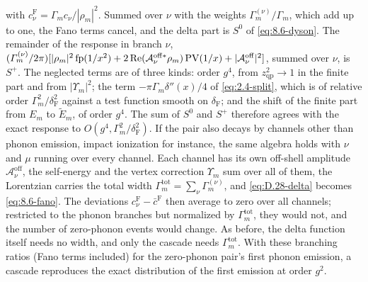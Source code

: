with $c^{\mathrm{F}}_\nu = \varGamma_mc_\nu/|\rho_m|^2$. Summed over $\nu$ with the weights $\varGamma^{(\nu)}_m/\varGamma_m$, which add up to one, the Fano terms cancel, and the delta part is $S^0$ of \cref{eq:8.6-dyson}. The remainder of the response in branch $\nu$, $(\varGamma^{(\nu)}_m/2\pi)[|\rho_m|^2\operatorname{fp}(1/x^2) + 2\operatorname{Re}(\mathcal{A}^{\mathrm{off}*}_\nu\rho_m)\operatorname{PV}(1/x) + |\mathcal{A}^{\mathrm{off}}_\nu|^2]$, summed over $\nu$, is $S^+$. The neglected terms are of three kinds: order $g^4$, from $z_{\mathrm{qp}}^2 \to 1$ in the finite part and from $|\Upsilon_m|^2$; the term $-\pi\varGamma_m\delta''(x)/4$ of \cref{eq:2.4-split}, which is of relative order $\varGamma_m^2/\delta_{\mathrm{F}}^2$ against a test function smooth on $\delta_{\mathrm{F}}$; and the shift of the finite part from $E_m$ to $\tilde E_m$, of order $g^4$. The sum of $S^0$ and $S^+$ therefore agrees with the exact response to $O(g^4, \varGamma_m^2/\delta_{\mathrm{F}}^2)$. If the pair also decays by channels other than phonon emission, impact ionization for instance, the same algebra holds with $\nu$ and $\mu$ running over every channel. Each channel has its own off-shell amplitude $\mathcal{A}^{\mathrm{off}}_\nu$, the self-energy and the vertex correction $\Upsilon_m$ sum over all of them, the Lorentzian carries the total width $\varGamma^{\mathrm{tot}}_m = \sum_\nu\varGamma^{(\nu)}_m$, and \cref{eq:D.28-delta} becomes \cref{eq:8.6-fano}. The deviations $c^{\mathrm{F}}_\nu - \bar c^{\mathrm{F}}$ then average to zero over all channels; restricted to the phonon branches but normalized by $\varGamma^{\mathrm{tot}}_m$, they would not, and the number of zero-phonon events would change. As before, the delta function itself needs no width, and only the cascade needs $\varGamma^{\mathrm{tot}}_m$. With these branching ratios (Fano terms included) for the zero-phonon pair's first phonon emission, a cascade reproduces the exact distribution of the first emission at order $g^2$.

